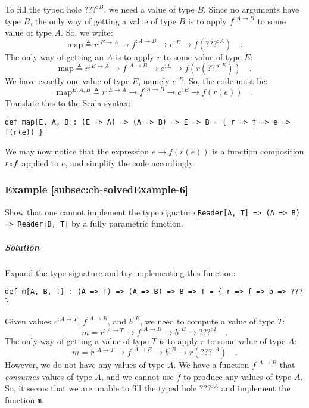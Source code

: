 To fill the typed hole $\text{???}^{:B}$, we need a value of type
$B$. Since no arguments have type $B$, the only way of getting a
value of type $B$ is to apply $f^{:A\rightarrow B}$ to some value
of type $A$. So, we write:
\[
\text{map}\triangleq r^{:E\rightarrow A}\rightarrow f^{:A\rightarrow B}\rightarrow e^{:E}\rightarrow f(???^{:A})\quad.
\]
The only way of getting an $A$ is to apply $r$ to some value of
type $E$:
\[
\text{map}\triangleq r^{:E\rightarrow A}\rightarrow f^{:A\rightarrow B}\rightarrow e^{:E}\rightarrow f(r(???^{:E}))\quad.
\]
We have exactly one value of type $E$, namely $e^{:E}$. So, the
code must be:
\[
\text{map}^{E,A,B}\triangleq r^{:E\rightarrow A}\rightarrow f^{:A\rightarrow B}\rightarrow e^{:E}\rightarrow f(r(e))\quad.
\]
Translate this to the Scala syntax:
\begin{lstlisting}
def map[E, A, B]: (E => A) => (A => B) => E => B = { r => f => e => f(r(e)) }
\end{lstlisting}
We may now notice that the expression $e\rightarrow f(r(e))$ is a
function composition $r\bef f$ applied to $e$, and simplify the
code accordingly.

\subsubsection{Example \label{subsec:ch-solvedExample-6}\ref{subsec:ch-solvedExample-6}}

Show that one cannot implement the type signature \lstinline!Reader[A, T] => (A => B) => Reader[B, T]!
by a fully parametric function.

\subparagraph{Solution}

Expand the type signature and try implementing this function:
\begin{lstlisting}
def m[A, B, T] : (A => T) => (A => B) => B => T = { r => f => b => ??? }
\end{lstlisting}
Given values $r^{:A\rightarrow T}$, $f^{:A\rightarrow B}$, and $b^{:B}$,
we need to compute a value of type $T$:
\[
m=r^{:A\rightarrow T}\rightarrow f^{:A\rightarrow B}\rightarrow b^{:B}\rightarrow???^{:T}\quad.
\]
The only way of getting a value of type $T$ is to apply $r$ to some
value of type $A$:
\[
m=r^{:A\rightarrow T}\rightarrow f^{:A\rightarrow B}\rightarrow b^{:B}\rightarrow r(???^{:A})\quad.
\]
However, we do not have any values of type $A$. We have a function
$f^{:A\rightarrow B}$ that \emph{consumes} values of type $A$, and
we cannot use $f$ to produce any values of type $A$. So, it seems
that we are unable to fill the typed hole $\text{???}^{:A}$ and implement
the function \lstinline!m!.

